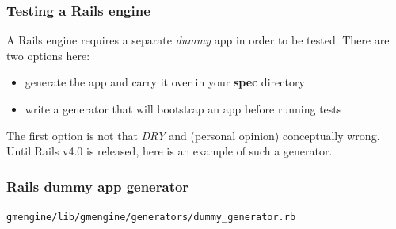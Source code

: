 \documentclass[compress]{beamer}
\begin{document}
\begin{frame}
\frametitle{Testing a Rails engine}

A Rails engine requires a separate \emph{dummy} app in order to be tested.
There are two options here:
\begin{itemize}[<+->]
  \item generate the app and carry it over in your \textbf{spec} directory
  \item write a generator that will bootstrap an app before running tests
\end{itemize}

The first option is not that \emph{DRY} and (personal opinion) conceptually wrong.
Until Rails v4.0 is released, here is an example of such a generator.
\end{frame}

\begin{frame}
\frametitle{Rails dummy app generator}

\texttt{gmengine/lib/gmengine/generators/dummy\_generator.rb}
\inputminted[fontsize=\tiny,gobble=0,linenos=true,firstline=0,lastline=0]{ruby}{code/gmengine/lib/gmengine/generators/dummy_generator.rb}
\end{frame}
\end{document}
